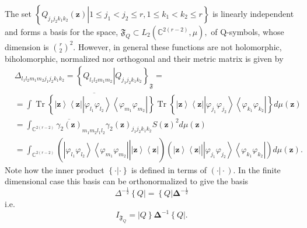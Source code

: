 \documentclass[aps,preprint]{revtex4}%
\begin{document}
The set $\left\{  \left.  Q_{j_{1}j_{2}k_{1}k_{2}}\left(  \mathbf{z}\right)
\right\vert 1\leq j_{1}<j_{2}\leq r,1\leq k_{1}<k_{2}\leq r\right\}  $ is
linearly independent and forms a basis for the space, $\mathfrak{F}_{Q}\subset
L_{2}\left(  \mathbb{C}^{2\left(  r-2\right)  },\mu\right)  ,$ of Q-symbols,
whose dimension is $\binom{r}{2}^{2}$. However, in general these functions are
not holomorphic, biholomorphic, normalized nor orthogonal and their metric
matrix is given by
\begin{align}
&  \Delta_{l_{1}l_{2}m_{1}m_{2}j_{1}j_{2}k_{1}k_{2}}=\left\{  Q_{l_{1}%
l_{2}m_{1}m_{2}}\left\vert Q_{j_{1}j_{2}k_{1}k_{2}}\right.  \right\}
_{\mathfrak{F}}=\nonumber\\
&  =\int\overline{\operatorname*{Tr}\left\{  \left\vert \mathbf{z}%
\right\rangle \left\langle \mathbf{z}\right\vert \left\vert \varphi_{l_{1}%
}\varphi_{l_{2}}\right\rangle \left\langle \varphi_{m_{1}}\varphi_{m_{2}%
}\right\vert \right\}  }\operatorname*{Tr}\left\{  \left\vert \mathbf{z}%
\right\rangle \left\langle \mathbf{z}\right\vert \left\vert \varphi_{j_{1}%
}\varphi_{j_{2}}\right\rangle \left\langle \varphi_{k_{1}}\varphi_{k_{2}%
}\right\vert \right\}  d\mu\left(  \mathbf{z}\right) \nonumber\\
&  =\int_{\mathbb{C}^{2\left(  r-2\right)  }}\overline{\gamma_{2}\left(
\mathbf{z}\right)  }_{m_{1}m_{2}l_{1}l_{2}}\gamma_{2}\left(  \mathbf{z}%
\right)  _{j_{1}j_{2}k_{1}k_{2}}S\left(  \mathbf{z}\right)  ^{2}d\mu\left(
\mathbf{z}\right) \nonumber\\
&  =\int_{\mathbb{C}^{2\left(  r-2\right)  }}\left(  \left.
\overset{}{\left\vert \varphi_{l_{1}}\varphi_{l_{2}}\right\rangle \left\langle
\varphi_{m_{1}}\varphi_{m_{2}}\right\vert }\right\vert \left\vert
\mathbf{z}\right\rangle \left\langle \mathbf{z}\right\vert \right)  \left(
\left.  \overset{}{\left\vert \mathbf{z}\right\rangle \left\langle
\mathbf{z}\right\vert }\right\vert \left\vert \varphi_{j_{1}}\varphi_{j_{2}%
}\right\rangle \left\langle \varphi_{k_{1}}\varphi_{k_{2}}\right\vert \right)
d\mu\left(  \mathbf{z}\right)  .
\end{align}
Note how the inner product $\left\{  \cdot\left\vert \cdot\right.  \right\}  $
is defined in terms of $\left(  \left.  \cdot\right\vert \cdot\right)  .$ In
the finite dimensional case this basis can be orthonormalized to give the
basis
\begin{equation}
\Delta^{-\frac{1}{2}}\left\{  Q\right\vert =\left\{  Q\right\vert
\boldsymbol{\Delta}^{-\frac{1}{2}}%
\end{equation}
i.e.%
\begin{equation}
I_{\mathfrak{F}_{Q}}=\left\vert Q\right\}  \boldsymbol{\Delta}^{-1}\left\{
Q\right\vert .
\end{equation}
\end{document}
